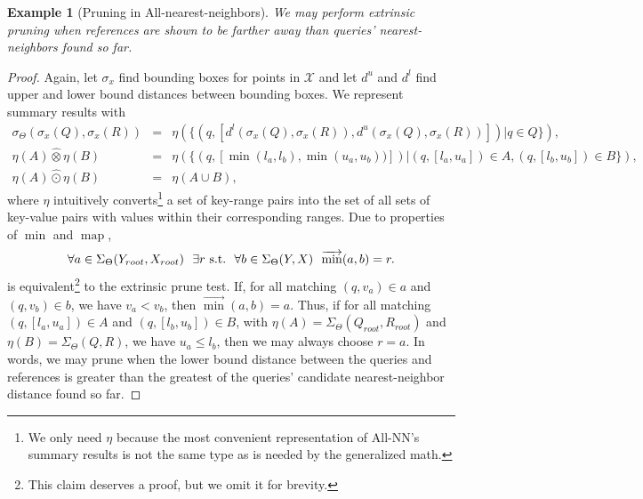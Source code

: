 \documentclass{article}
\newtheorem{example} {Example}
\newcommand{\GNP}[1][\psi]{{#1}_{\Theta}}
\newcommand{\otimeshat}{\mathbin{\widehat{\otimes}}}
\newcommand{\odothat}{\mathbin{\widehat{\odot}}}
\DeclareMathOperator*{\map}{map}
\newcommand{\st}{{\rm~s.t.~}}
\newcommand{\disthrectmin}{d^{l}}
\newcommand{\disthrectmax}{d^{u}}
\newcommand{\kdleft}[1]{#1^{\!L}}
\newcommand{\kdright}[1]{#1^{\!R}}
\begin{document}
\begin{example}[Pruning in All-nearest-neighbors]
  We may perform extrinsic pruning when references are shown to be
  farther away than queries' nearest-neighbors found so far.
\end{example}
\begin{proof}
  Again, let $\sigma_x$ find bounding boxes for points in
  $\mathcal{X}$ and let $\disthrectmax$ and $\disthrectmin$ find upper and
  lower bound distances between bounding boxes.  We represent summary
  results with
  \begin{eqnarray*}
    \GNP[\sigma](\sigma_x(Q),\sigma_x(R)) & = & \eta(\{(q,[\disthrectmin(\sigma_x(Q),\sigma_x(R)), \disthrectmax(\sigma_x(Q),\sigma_x(R))]) | q \in Q\}), \\
    \eta(A) \otimeshat \eta(B) & = & \eta(\{(q,[\min(l_a,l_b),\min(u_a,u_b))]) | (q,[l_a,u_a]) \in A, (q,[l_b,u_b]) \in B\}), \\
    \eta(A) \odothat \eta(B) & = & \eta(A \cup B),
  \end{eqnarray*}
  where $\eta$ intuitively converts\footnote{We only need $\eta$
  because the most convenient representation of All-NN's summary
  results is not the same type as is needed by the generalized math.}
  a set of key-range pairs into the set of all sets of key-value pairs
  with values within their corresponding ranges.  Due to properties of
  $\min$ and $\map$,
  \[
  \forall a \in \GNP[\Sigma](Y_{root},X_{root})~~ \exists r \st~ \forall b \in \GNP[\Sigma](Y,X)~~ \overrightarrow{\min}(a,b) = r.
  \]
  is equivalent\footnote{This claim deserves a proof, but we omit it
  for brevity.} to the extrinsic prune test.  If, for all matching
  $(q,v_a) \in a$ and $(q,v_b) \in b$, we have $v_a < v_b$, then
  $\overrightarrow{\min}(a,b) = a$.  Thus, if for all matching
  $(q,[l_a,u_a]) \in A$ and $(q,[l_b,u_b]) \in B$, with $\eta(A) =
  \GNP[\Sigma](Q_{root},R_{root})$ and $\eta(B) = \GNP[\Sigma](Q,R)$,
  we have $u_a \leq l_b$, then we may always choose $r = a$.  In
  words, we may prune when the lower bound distance between the
  queries and references is greater than the greatest of the queries'
  candidate nearest-neighbor distance found so far.
\end{proof}
\end{document}
